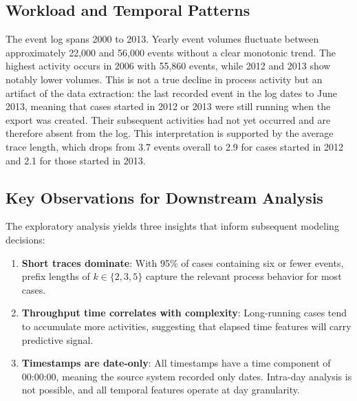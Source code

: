\subsection{Workload and Temporal Patterns}

The event log spans 2000 to 2013. Yearly event volumes fluctuate between approximately 22,000 and 56,000 events without a clear monotonic trend. The highest activity occurs in 2006 with 55,860 events, while 2012 and 2013 show notably lower volumes. This is not a true decline in process activity but an artifact of the data extraction: the last recorded event in the log dates to June 2013, meaning that cases started in 2012 or 2013 were still running when the export was created. Their subsequent activities had not yet occurred and are therefore absent from the log. This interpretation is supported by the average trace length, which drops from 3.7 events overall to 2.9 for cases started in 2012 and 2.1 for those started in 2013.

\subsection{Key Observations for Downstream Analysis}

The exploratory analysis yields three insights that inform subsequent modeling decisions:

\begin{enumerate}
    \item \textbf{Short traces dominate}: With 95\% of cases containing six or fewer events, prefix lengths of $k \in \{2, 3, 5\}$ capture the relevant process behavior for most cases.
    \item \textbf{Throughput time correlates with complexity}: Long-running cases tend to accumulate more activities, suggesting that elapsed time features will carry predictive signal.
    \item \textbf{Timestamps are date-only}: All timestamps have a time component of 00:00:00, meaning the source system recorded only dates. Intra-day analysis is not possible, and all temporal features operate at day granularity.
\end{enumerate}